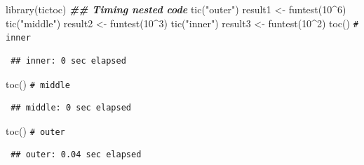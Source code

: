 \documentclass[
  10pt,
]{book}
\newenvironment{Shaded}{\begin{snugshade}}{\end{snugshade}}
\newcommand{\CommentTok}[1]{\textcolor[rgb]{0.56,0.35,0.01}{\textit{#1}}}
\newcommand{\DecValTok}[1]{\textcolor[rgb]{0.00,0.00,0.81}{#1}}
\newcommand{\DocumentationTok}[1]{\textcolor[rgb]{0.56,0.35,0.01}{\textbf{\textit{#1}}}}
\newcommand{\FunctionTok}[1]{\textcolor[rgb]{0.00,0.00,0.00}{#1}}
\newcommand{\NormalTok}[1]{#1}
\newcommand{\OtherTok}[1]{\textcolor[rgb]{0.56,0.35,0.01}{#1}}
\newcommand{\SpecialCharTok}[1]{\textcolor[rgb]{0.00,0.00,0.00}{#1}}
\newcommand{\StringTok}[1]{\textcolor[rgb]{0.31,0.60,0.02}{#1}}
\theoremstyle{break}
\theoremstyle{nonumberplain}
\renewcommand{\CommentTok}[1]{\textcolor[rgb]{0.41,0.41,0.41}{\texttt{#1}}}
\begin{document}
\begin{Shaded}
\begin{Highlighting}[]
\FunctionTok{library}\NormalTok{(tictoc)}
\DocumentationTok{\#\# Timing nested code}
\FunctionTok{tic}\NormalTok{(}\StringTok{"outer"}\NormalTok{)}
\NormalTok{   result1 }\OtherTok{\textless{}{-}} \FunctionTok{funtest}\NormalTok{(}\DecValTok{10}\SpecialCharTok{\^{}}\DecValTok{6}\NormalTok{)}
   \FunctionTok{tic}\NormalTok{(}\StringTok{"middle"}\NormalTok{)}
\NormalTok{      result2 }\OtherTok{\textless{}{-}} \FunctionTok{funtest}\NormalTok{(}\DecValTok{10}\SpecialCharTok{\^{}}\DecValTok{3}\NormalTok{)}
      \FunctionTok{tic}\NormalTok{(}\StringTok{"inner"}\NormalTok{)}
\NormalTok{         result3 }\OtherTok{\textless{}{-}} \FunctionTok{funtest}\NormalTok{(}\DecValTok{10}\SpecialCharTok{\^{}}\DecValTok{2}\NormalTok{)}
      \FunctionTok{toc}\NormalTok{() }\CommentTok{\# inner}
\end{Highlighting}
\end{Shaded}

\begin{verbatim}
 ## inner: 0 sec elapsed
\end{verbatim}

\begin{Shaded}
\begin{Highlighting}[]
   \FunctionTok{toc}\NormalTok{() }\CommentTok{\# middle}
\end{Highlighting}
\end{Shaded}

\begin{verbatim}
 ## middle: 0 sec elapsed
\end{verbatim}

\begin{Shaded}
\begin{Highlighting}[]
\FunctionTok{toc}\NormalTok{() }\CommentTok{\# outer}
\end{Highlighting}
\end{Shaded}

\begin{verbatim}
 ## outer: 0.04 sec elapsed
\end{verbatim}
\end{document}
